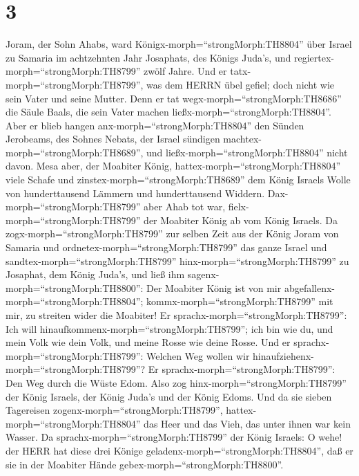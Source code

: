 \hypertarget{section-2}{%
\section{3}\label{section-2}}

 Joram, der Sohn Ahabs, ward
Königx-morph=``strongMorph:TH8804'' über Israel zu Samaria im
achtzehnten Jahr Josaphats, des Königs Juda's, und
regiertex-morph=``strongMorph:TH8799'' zwölf Jahre.  Und er
tatx-morph=``strongMorph:TH8799'', was dem HERRN übel gefiel; doch nicht
wie sein Vater und seine Mutter. Denn er tat
wegx-morph=``strongMorph:TH8686'' die Säule Baals, die sein Vater machen
ließx-morph=``strongMorph:TH8804''.  Aber er blieb hangen
anx-morph=``strongMorph:TH8804'' den Sünden Jerobeams, des Sohnes
Nebats, der Israel sündigen machtex-morph=``strongMorph:TH8689'', und
ließx-morph=``strongMorph:TH8804'' nicht davon.  Mesa aber,
der Moabiter König, hattex-morph=``strongMorph:TH8804'' viele Schafe und
zinstex-morph=``strongMorph:TH8689'' dem König Israels Wolle von
hunderttausend Lämmern und hunderttausend Widdern. 
Dax-morph=``strongMorph:TH8799'' aber Ahab tot war,
fielx-morph=``strongMorph:TH8799'' der Moabiter König ab vom König
Israels.  Da zogx-morph=``strongMorph:TH8799'' zur selben
Zeit aus der König Joram von Samaria und
ordnetex-morph=``strongMorph:TH8799'' das ganze Israel  und
sandtex-morph=``strongMorph:TH8799'' hinx-morph=``strongMorph:TH8799''
zu Josaphat, dem König Juda's, und ließ ihm
sagenx-morph=``strongMorph:TH8800'': Der Moabiter König ist von mir
abgefallenx-morph=``strongMorph:TH8804'';
kommx-morph=``strongMorph:TH8799'' mit mir, zu streiten wider die
Moabiter! Er sprachx-morph=``strongMorph:TH8799'': Ich will
hinaufkommenx-morph=``strongMorph:TH8799''; ich bin wie du, und mein
Volk wie dein Volk, und meine Rosse wie deine Rosse.  Und er
sprachx-morph=``strongMorph:TH8799'': Welchen Weg wollen wir
hinaufziehenx-morph=``strongMorph:TH8799''? Er
sprachx-morph=``strongMorph:TH8799'': Den Weg durch die Wüste Edom.
 Also zog hinx-morph=``strongMorph:TH8799'' der König
Israels, der König Juda's und der König Edoms. Und da sie sieben
Tagereisen zogenx-morph=``strongMorph:TH8799'',
hattex-morph=``strongMorph:TH8804'' das Heer und das Vieh, das unter
ihnen war kein Wasser.  Da
sprachx-morph=``strongMorph:TH8799'' der König Israels: O wehe! der HERR
hat diese drei Könige geladenx-morph=``strongMorph:TH8804'', daß er sie
in der Moabiter Hände gebex-morph=``strongMorph:TH8800''. 
